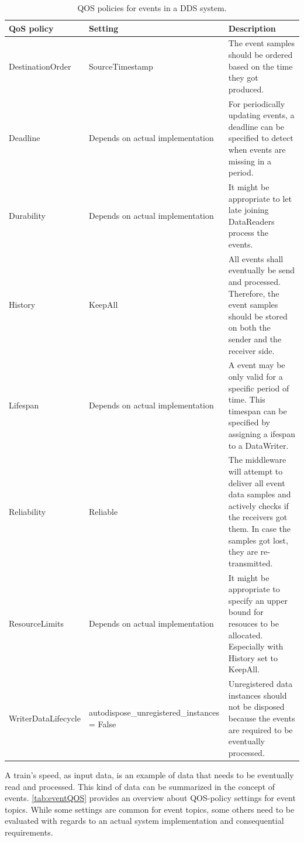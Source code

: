 \begin{table}[h!]
	\begin{center}
		\caption{\Gls*{QOS} policies for events in a \gls*{DDS} system.}
		\label{tab:eventQOS}
		\begin{tabularx}{\textwidth}{|X|X|X|}
			\hline
			\textbf{QoS policy} & \textbf{Setting} & \textbf{Description}\\
			\hline \hline
			DestinationOrder & SourceTimestamp & The event samples should be ordered based on the time they got produced. \\
			\hline
			Deadline & Depends on actual implementation & For periodically updating events, a deadline can be specified to detect when events are missing in a period. \\
			\hline
			Durability & Depends on actual implementation & It might be appropriate to let late joining DataReaders process the events. \\
			\hline
			History & KeepAll & All events shall eventually be send and processed. Therefore, the event samples should be stored on both the sender and the receiver side.  \\
			\hline
			Lifespan & Depends on actual implementation & A event may be only valid for a specific period of time. This timespan can be specified by assigning a ifespan to a DataWriter. \\
			\hline
			Reliability & Reliable & The middleware will attempt to deliver all event data samples and actively checks if the receivers got them. In case the samples got lost, they are re-transmitted. \\
			\hline
			ResourceLimits & Depends on actual implementation & It might be appropriate to specify an upper bound for resouces to be allocated. Especially with History set to KeepAll. \\
			\hline
			WriterDataLifecycle & autodispose\_unregistered\-\_instances = False & Unregistered data instances should not be disposed because the events are required to be eventually processed. \\
			\hline
		\end{tabularx}
	\end{center}
\end{table}

A train's speed, as input data, is an example of data that needs to be eventually read and processed.
This kind of data can be summarized in the concept of events.
\autoref{tab:eventQOS} provides an overview about \gls*{QOS}-policy settings for event topics.
While some settings are common for event topics, some others need to be evaluated with regards to an actual system implementation and consequential requirements.

